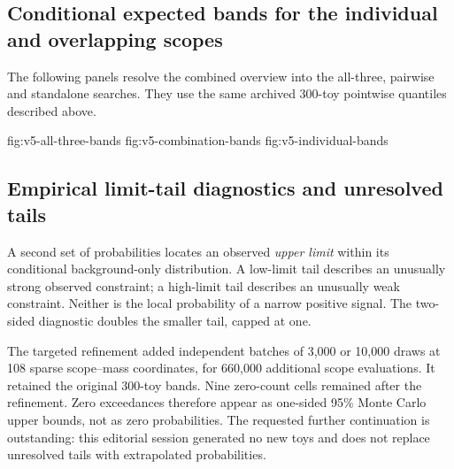 \subsection{Conditional expected bands for the individual and overlapping scopes}
The following panels resolve the combined overview into the all-three,
pairwise and standalone searches. They use the same archived 300-toy
pointwise quantiles described above.

{fig:v5-all-three-bands}
{fig:v5-combination-bands}
{fig:v5-individual-bands}
\FloatBarrier

\subsection{Empirical limit-tail diagnostics and unresolved tails}
\label{sec:v5-tail-results}

A second set of probabilities locates an observed \emph{upper limit} within its
conditional background-only distribution. A low-limit tail describes an
unusually strong observed constraint; a high-limit tail describes an unusually
weak constraint. Neither is the local probability of a narrow positive signal.
The two-sided diagnostic doubles the smaller tail, capped at one.

The targeted refinement added independent batches of 3,000 or 10,000 draws at
108 sparse scope--mass coordinates, for 660,000 additional scope evaluations.
It retained the original 300-toy bands. Nine zero-count cells remained after
the refinement. Zero exceedances therefore appear as one-sided 95\% Monte Carlo
upper bounds, not as zero probabilities. The requested further continuation
is outstanding: this editorial session generated no new toys and does not
replace unresolved tails with extrapolated probabilities.

